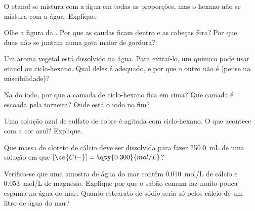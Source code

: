 \begin{exercise}[$\star\star$]\label{exo:g11:dissolution:7}
O etanol  se mistura com a água em todas as proporções,
mas o hexano  não se mistura com a água. Explique.
\end{exercise}

\begin{exercise}[$\star\star$]\label{exo:g11:dissolution:8}
Olhe a figura da . Por que as caudas ficam dentro e as cabeças
fora? Por que duas  não se juntam numa gota maior de gordura?
\end{exercise}

\begin{exercise}[$\star\star$]\label{exo:g11:dissolution:9}
Um aroma vegetal está dissolvido na água. Para extraí-lo, um químico pode
usar etanol ou ciclo-hexano. Qual deles é adequado, e por que o outro não
é (pense na miscibilidade)?
\end{exercise}

\begin{exercise}[$\star\star$]\label{exo:g11:dissolution:10}
Na  do iodo, por que a camada de ciclo-hexano fica em cima? Que
camada é escoada pela torneira? Onde está o iodo no fim?
\end{exercise}

\begin{exercise}[$\star\star$]\label{exo:g11:dissolution:11}
Uma solução azul de sulfato de cobre é agitada com ciclo-hexano. O que
acontece com a cor azul? Explique.
\end{exercise}

\begin{exercise}[$\star\star\star$]\label{exo:g11:dissolution:12}
Que massa de cloreto de cálcio deve ser dissolvida para fazer
\qty{250.0}{mL} de uma solução em que $[\ce{Cl-}] = \qty{0.300}{mol/L}$?
\end{exercise}

\begin{exercise}[$\star\star\star$]\label{exo:g11:dissolution:13}
Verifica-se que uma amostra de água do mar contém \qty{0.010}{mol/L} de
 cálcio e \qty{0.053}{mol/L} de  magnésio. Explique por que o
sabão comum faz muito pouca espuma na água do mar. Quanto estearato de
sódio seria  só pelos  cálcio de um litro de água do mar?
\end{exercise}

